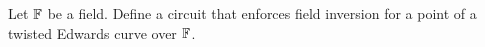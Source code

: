 \begin{comment}
\begin{example}[Baby-JubJub]
Considering our pen-and-paper baby-jubjub curve over from XXX\sme{add reference}. We recall from XXX\sme{add reference} that $(11,9)$ is a generator for the large prime order subgroup. We therefor already know from XXX\sme{add reference} that
$(11,9) + (7,8) = (11,9) + [3](11,9) = [4](11,9) = (2,9)$. So we execute the circuit  and get
\begin{align*}
x_1 = 11 & = S_1\\
x_2 = 7 & = S_2\\
y_1 = 9 & = S_3 \\
y_2 = 8 & = S_4 \\
1+ 8\cdot S_1\cdot S_2 \cd = 9 & = S_5 \\
y_3 = 8 & = S_6 \\
11 \cdot 8 = 10 & = S_7 \\
11 \cdot 7 =  12 & = S_8 \\
7 \cdot 9 =  11 & = S_9 \\
9 \cdot 8 = 7 & = S_{10} \\
12 \cdot 7 = 6 & = S_{11} \\
S_5 \cdot (1+ d\cdot S_{11}) & = 1 \\
S_6 \cdot (1 - d\cdot S_{11}) & = 1 \\
S_5 \cdot (S_9 + S_7) & = S_{14} \\
S_6 \cdot (S_{10} - a\cdot S_8) & = S_{15}
\end{align*}
\end{example}
\end{comment}
\begin{exercise}
Let $\mathbb{F}$ be a field. Define a circuit that enforces field inversion for a point of a twisted Edwards curve over $\mathbb{F}$.
\end{exercise}
